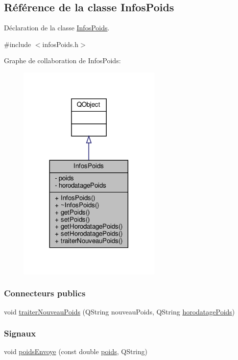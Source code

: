 \hypertarget{class_infos_poids}{}\subsection{Référence de la classe Infos\+Poids}
\label{class_infos_poids}


Déclaration de la classe \hyperlink{class_infos_poids}{Infos\+Poids}.  




{\ttfamily \#include $<$infos\+Poids.\+h$>$}



Graphe de collaboration de Infos\+Poids\+:\nopagebreak
\begin{figure}[H]
\begin{center}
\leavevmode
\includegraphics[width=200pt]{class_infos_poids__coll__graph}
\end{center}
\end{figure}
\subsubsection*{Connecteurs publics}
\begin{DoxyCompactItemize}
\item 
void \hyperlink{class_infos_poids_aa5284d38d33adba31ba033b8af61cc96}{traiter\+Nouveau\+Poids} (Q\+String nouveau\+Poids, Q\+String \hyperlink{class_infos_poids_a6cff463552adfdde9430073a87878494}{horodatage\+Poids})
\end{DoxyCompactItemize}
\subsubsection*{Signaux}
\begin{DoxyCompactItemize}
\item 
void \hyperlink{class_infos_poids_a3c4ca9068911e45d0207de051ef5b402}{poids\+Envoye} (const double \hyperlink{class_infos_poids_ac5faebb99bd0f87f96b442f10349cbd8}{poids}, Q\+String)
\end{DoxyCompactItemize}

